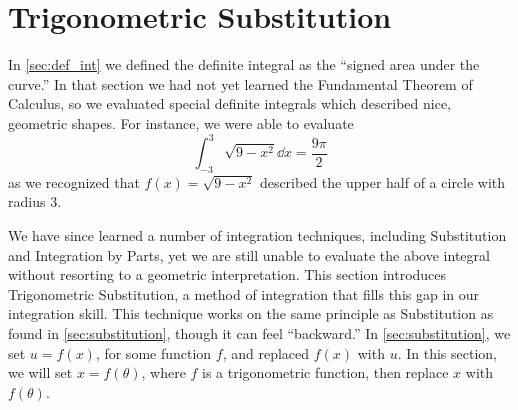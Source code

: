

\section{Trigonometric Substitution}\label{sec:trig_sub}

In \autoref{sec:def_int} we defined the definite integral as the ``signed area under the curve.'' In that section we had not yet learned the Fundamental Theorem of Calculus, so we evaluated special definite integrals which described nice, geometric shapes. For instance, we were able to evaluate
\begin{equation}
\int_{-3}^3\sqrt{9-x^2}\dd x = \frac{9\pi}{2}\label{eq:trigsub1}
\end{equation}
 as we recognized that $f(x) = \sqrt{9-x^2}$ described the upper half of a circle with radius 3. 

We have since learned a number of integration techniques, including Substitution and Integration by Parts, yet we are still unable to evaluate the above integral without resorting to a geometric interpretation. This section introduces Trigonometric Substitution, a method of integration that fills this gap in our integration skill. This technique works on the same principle as Substitution as found in \autoref{sec:substitution}, though it can feel ``backward.'' In \autoref{sec:substitution}, we set $u=f(x)$, for some function $f$, and replaced $f(x)$ with $u$. In this section, we will set $x=f(\theta)$, where $f$ is a trigonometric function, then replace $x$ with $f(\theta)$. 

